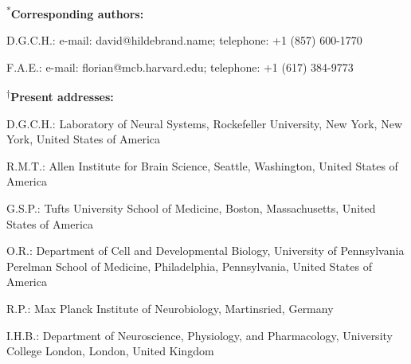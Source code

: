 \documentclass{article}
\begin{document}
\begin{hangpars}\small
\textsuperscript{*}\textbf{Corresponding authors:}

D.G.C.H.: e-mail: david@hildebrand.name; telephone: +1 (857) 600-1770

F.A.E.: e-mail: florian@mcb.harvard.edu; telephone: +1 (617) 384-9773

\textsuperscript{†}\textbf{Present addresses:}

D.G.C.H.: Laboratory of Neural Systems, Rockefeller University, New York, New York, United States of America

R.M.T.: Allen Institute for Brain Science, Seattle, Washington, United States of America

G.S.P.: Tufts University School of Medicine, Boston, Massachusetts, United States of America

O.R.: Department of Cell and Developmental Biology, University of Pennsylvania Perelman School of Medicine, Philadelphia, Pennsylvania, United States of America

R.P.: Max Planck Institute of Neurobiology, Martinsried, Germany

I.H.B.: Department of Neuroscience, Physiology, and Pharmacology, University College London, London, United Kingdom
\end{hangpars}
\end{document}
